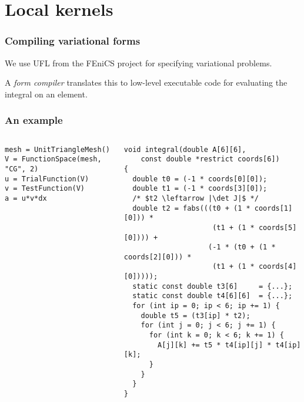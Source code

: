 \documentclass[presentation]{beamer}
\begin{document}
\section{Local kernels}

\begin{frame}
  \frametitle{Compiling variational forms}

  We use UFL \parencite{Alnaes:2014} from the FEniCS project for
  specifying variational problems.

  A \emph{form compiler} translates this to low-level executable code
  for evaluating the integral on an element.
\end{frame}

\begin{frame}[fragile]
  \frametitle{An example}
  \begin{columns}
    \begin{column}{0.5\textwidth}
\begin{verbatim}
mesh = UnitTriangleMesh()
V = FunctionSpace(mesh, "CG", 2)
u = TrialFunction(V)
v = TestFunction(V)
a = u*v*dx
\end{verbatim}
    \end{column}
\hspace{-3em}
    \begin{column}{0.65\textwidth}
\begin{verbatim}
void integral(double A[6][6], 
    const double *restrict coords[6])
{
  double t0 = (-1 * coords[0][0]);
  double t1 = (-1 * coords[3][0]);
  /* $t2 \leftarrow |\det J|$ */
  double t2 = fabs(((t0 + (1 * coords[1][0])) *
                     (t1 + (1 * coords[5][0]))) +
                    (-1 * (t0 + (1 * coords[2][0])) *
                     (t1 + (1 * coords[4][0]))));
  static const double t3[6]     = {...};
  static const double t4[6][6]  = {...};
  for (int ip = 0; ip < 6; ip += 1) {
    double t5 = (t3[ip] * t2);
    for (int j = 0; j < 6; j += 1) {
      for (int k = 0; k < 6; k += 1) {
        A[j][k] += t5 * t4[ip][j] * t4[ip][k];
      }
    }
  }
}
\end{verbatim}
    \end{column}
  \end{columns}
\end{frame}
\end{document}
